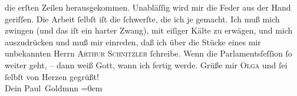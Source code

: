 \begin{ledgroupsized}[t]{13cm}
               die erſten Zeilen herausgekommen. Unabläſſig wird mir die Feder {\pb}aus der Hand geriſſen. Die Arbeit ſelbſt iſt die
               ſchwerſte, die ich je gemacht. Ich muß mich zwingen (und das iſt ein harter Zwang),
               mit eiſiger Kälte zu erwägen, und mich auszudrücken und muß mir einreden, daß ich
               über die Stücke eines mir
               unbekannten Herrn \textsc{Arthur Schnitzler} ſchreibe. Wenn die
               Parlamentsſeſſion ſo weiter geht, – dann weiß Gott, wann ich fertig werde.\pend
           \pstart
           Grüße mir \textsc{Olga} und ſei ſelbſt von Herzen gegrüßt! {\\[\baselineskip]}Dein \spacefill\mbox{Paul Goldmnn}\pend
           \leftskip=0em{}
         
         \endnumbering{}\end{ledgroupsized}  \newcommand{\dateiname}{L03192}\newcommand{\titel}{Paul Goldmann an Arthur Schnitzler, 14. 1. [1902]}\newcommand{\editorInnen}{Martin Anton Müller und Laura Untner}
      